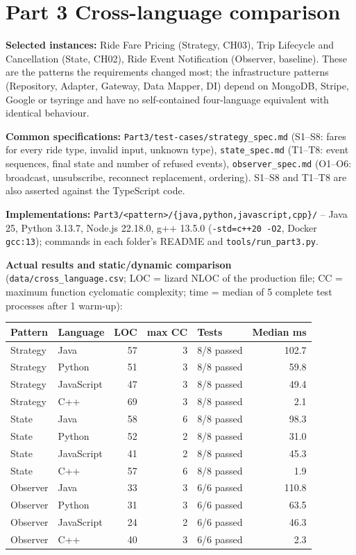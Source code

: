 \documentclass[11pt,a4paper]{article}
\begin{document}
\section{Part 3 Cross-language comparison}
\textbf{Selected instances:} Ride Fare Pricing (Strategy, CH03), Trip Lifecycle and Cancellation (State, CH02), Ride Event Notification
(Observer, baseline). These are the patterns the requirements changed most; the infrastructure patterns (Repository, Adapter, Gateway,
Data Mapper, DI) depend on MongoDB, Stripe, Google or tsyringe and have no self-contained four-language equivalent with identical behaviour.

\textbf{Common specifications:} \texttt{Part3/test-cases/strategy\_spec.md} (S1--S8: fares for every ride type, invalid input, unknown type),
\texttt{state\_spec.md} (T1--T8: event sequences, final state and number of refused events), \texttt{observer\_spec.md} (O1--O6:
broadcast, unsubscribe, reconnect replacement, ordering). S1--S8 and T1--T8 are also asserted against the TypeScript code.

\textbf{Implementations:} \texttt{Part3/<pattern>/\{java,python,javascript,cpp\}/} -- Java 25, Python 3.13.7, Node.js 22.18.0, g++ 13.5.0
(\texttt{-std=c++20 -O2}, Docker \texttt{gcc:13}); commands in each folder's README and \texttt{tools/run\_part3.py}.

\textbf{Actual results and static/dynamic comparison} (\texttt{data/cross\_language.csv}; LOC = lizard NLOC of the production file;
CC = maximum function cyclomatic complexity; time = median of 5 complete test processes after 1 warm-up):

\begin{tabular}{@{}llrrlr@{}}\toprule Pattern & Language & LOC & max CC & Tests & Median ms\\\midrule
Strategy & Java & 57 & 3 & 8/8 passed & 102.7 \\
Strategy & Python & 51 & 3 & 8/8 passed & 59.8 \\
Strategy & JavaScript & 47 & 3 & 8/8 passed & 49.4 \\
Strategy & C++ & 69 & 3 & 8/8 passed & 2.1 \\
State & Java & 58 & 6 & 8/8 passed & 98.3 \\
State & Python & 52 & 2 & 8/8 passed & 31.0 \\
State & JavaScript & 41 & 2 & 8/8 passed & 45.3 \\
State & C++ & 57 & 6 & 8/8 passed & 1.9 \\
Observer & Java & 33 & 3 & 6/6 passed & 110.8 \\
Observer & Python & 31 & 3 & 6/6 passed & 63.5 \\
Observer & JavaScript & 24 & 2 & 6/6 passed & 46.3 \\
Observer & C++ & 40 & 3 & 6/6 passed & 2.3 \\
\bottomrule\end{tabular}
\end{document}
